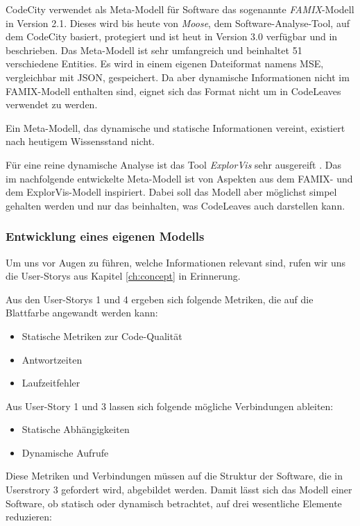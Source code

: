 CodeCity verwendet als Meta-Modell für Software das sogenannte \textit{FAMIX}-Modell in Version 2.1. Dieses wird bis heute von \textit{Moose}, dem Software-Analyse-Tool, auf dem CodeCity basiert, protegiert und ist heut in Version 3.0 verfügbar und in \cite{merrill1916moose} beschrieben. Das Meta-Modell ist sehr umfangreich und beinhaltet 51 verschiedene Entities. Es wird in einem eigenen Dateiformat namens MSE, vergleichbar mit JSON, gespeichert. Da aber dynamische Informationen nicht im FAMIX-Modell enthalten sind, eignet sich das Format nicht um in CodeLeaves verwendet zu werden.

Ein Meta-Modell, das dynamische und statische Informationen vereint, existiert nach heutigem Wissensstand nicht.

Für eine reine dynamische Analyse ist das Tool \textit{ExplorVis} sehr ausgereift \cite{fittkau2017software}. Das im nachfolgende entwickelte Meta-Modell ist von Aspekten aus dem FAMIX- und dem ExplorVis-Modell inspiriert. Dabei soll das Modell aber möglichst simpel gehalten werden und nur das beinhalten, was CodeLeaves auch darstellen kann.

\subsubsection*{Entwicklung eines eigenen Modells}

Um uns vor Augen zu führen, welche Informationen relevant sind, rufen wir uns die User-Storys aus Kapitel \ref{ch:concept} in Erinnerung.

Aus den User-Storys 1 und 4 ergeben sich folgende Metriken, die auf die Blattfarbe angewandt werden kann:

\begin{itemize}
  \item Statische Metriken zur Code-Qualität
  \item Antwortzeiten
  \item Laufzeitfehler
\end{itemize}

Aus User-Story 1 und 3 lassen sich folgende mögliche Verbindungen ableiten:

\begin{itemize}
  \item Statische Abhängigkeiten
  \item Dynamische Aufrufe
\end{itemize}

Diese Metriken und Verbindungen müssen auf die Struktur der Software, die in Userstrory 3 gefordert wird, abgebildet werden. Damit lässt sich das Modell einer Software, ob statisch oder dynamisch betrachtet, auf drei wesentliche Elemente reduzieren:


